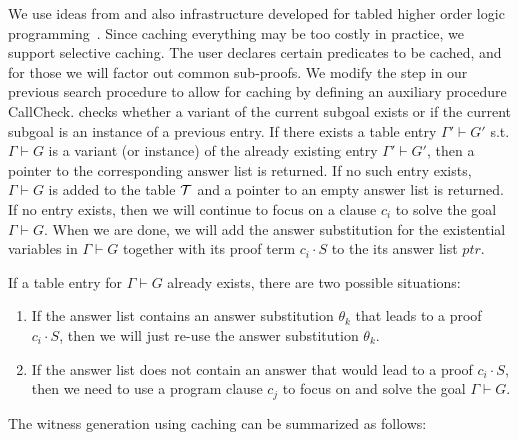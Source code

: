 \documentclass{llncs}
\newcommand{\vd}{\vdash}
\begin{document}
We use ideas from and also infrastructure developed for tabled higher
order logic programming~\cite{Pientka03phd,Pientka:ICLP02}.  Since
caching everything may be too costly in practice, we support selective
caching. The user declares certain predicates to be cached, and for
those we will factor out common sub-proofs. We modify the
{} step in our previous search procedure to allow for
caching by defining an auxiliary procedure {\sf
CallCheck}. {\sf{CallCheck($\Gamma \vd G, \cal{T}$)}} checks whether a
variant of the current subgoal exists or if the current subgoal is an
instance of a previous entry. If there exists a table entry $\Gamma'
\vd G'$ s.t. $\Gamma \vd G$ is a variant (or instance) of the already
existing entry $\Gamma' \vd G'$, then a pointer to the corresponding
answer list is returned. If no such entry exists, $\Gamma \vd G$ is
added to the table $\cal{T}$ and a pointer to an empty answer list is
returned. If no entry exists, then we will continue to focus on a
clause $c_i$ to solve the goal $\Gamma \vd G$. When we are done, we
will add the answer substitution for the existential variables in
$\Gamma \vd G$ together with its proof term $c_i \cdot S$ to the its
answer list $ptr$.

If a table entry for $\Gamma \vd G$ already exists, there are two
possible situations: 
\begin{enumerate}
\item If the answer list contains an answer
substitution $\theta_k$ that leads to a proof $c_i \cdot S$,
then we will just re-use the answer substitution $\theta_k$. 
\item If the
answer list does not contain an answer that would lead to a proof
$c_i \cdot S$, then we need to use a program clause $c_j$ to focus on
and solve the goal $\Gamma \vd G$. 
\end{enumerate}
The witness generation using
caching can be summarized as follows:
\end{document}
